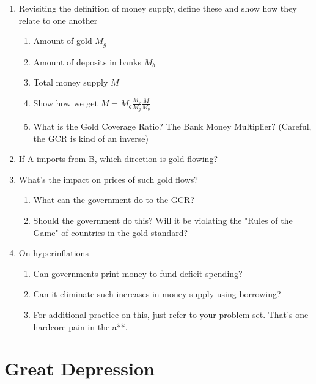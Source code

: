 \documentclass[11pt]{scrartcl}
\begin{document}
\begin{enumerate}
\item Revisiting the definition of money supply, define these and show how they relate to one another
\begin{enumerate}
\item Amount of gold $M_g$
\item Amount of deposits in banks $M_b$
\item Total money supply $M$
\item Show how we get $M=M_g \frac{M_b}{M_g} \frac{M}{M_b}$
\item What is the Gold Coverage Ratio? The Bank Money Multiplier? (Careful, the GCR is kind of an inverse)
\end{enumerate}
\item If A imports from B, which direction is gold flowing?
\item What's the impact on prices of such gold flows? 
\begin{enumerate}
\item What can the government do to the GCR?
\item Should the government do this? Will it be violating the "Rules of the Game" of countries in the gold standard?
\end{enumerate}
\item On hyperinflations
\begin{enumerate}
\item Can governments print money to fund deficit spending?
\item Can it eliminate such increases in money supply using borrowing?
\item For additional practice on this, just refer to your problem set. That's one hardcore pain in the a**.
\end{enumerate}
\end{enumerate}

\section{Great Depression}
\end{document}
